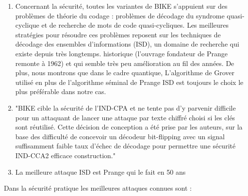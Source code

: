 \documentclass[12pt,openany]{report}
\begin{document}
\begin{enumerate}


\item Concernant la sécurité, toutes les variantes de BIKE s'appuient sur des
problèmes de théorie du codage : problèmes de décodage du syndrome quasi-cyclique et de recherche de mots de code quasi-cycliques. Les meilleures stratégies pour résoudre ces problèmes reposent sur les techniques de décodage des ensembles d'informations (ISD), un domaine de recherche qui existe depuis très longtemps.
historique (l’ouvrage fondateur de Prange remonte à 1962) et qui semble très peu
amélioration au fil des années. De plus, nous montrons que dans le cadre quantique,
L’algorithme de Grover utilisé en plus de l’algorithme séminal de Prange ISD est toujours le
choix le plus préférable dans notre cas.


\item "BIKE cible la sécurité de l'IND-CPA et ne tente pas d'y parvenir
difficile pour un attaquant de lancer une attaque par texte chiffré choisi si les clés sont
réutilisé. Cette décision de conception a été prise par les auteurs, sur la base des
difficulté de concevoir un décodeur bit-flipping avec un signal suffisamment faible
taux d'échec de décodage pour permettre une sécurité IND-CCA2 efficace
construction."
\item  La meilleure attaque ISD est Prange qui le fait en 50 ans

\end{enumerate}
Dans la sécurité pratique les meilleures attaques connues sont \cite{Rap} :
\end{document}
